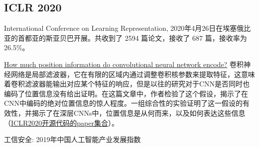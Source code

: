\begin{pre}
\subsection{ICLR 2020}
International Conference on Learning Representation, 2020年4月26日在埃塞俄比亚的首都亚的斯亚贝巴开展。共收到了 2594 篇论文，接收了 687 篇，接收率为 26.5\%。

\href{https://openreview.net/forum?id=rJeB36NKvB}{How much position information do convolutional neural network encode?}
卷积神经网络是局部滤波器，它在有限的区域内通过调整卷积核参数来提取特征，这意味着卷积滤波器能输出对应某个特征的响应，但是以往的研究对于CNN是否同时也编码了位置信息没有给出证明。在这篇文章中，作者检验了这个假设，揭示了在CNN中编码的绝对位置信息的惊人程度。一组综合性的实验证明了这一假设的有效性，并揭示了在深层CNNs中，位置信息是从何而来，以及如何表达这些信息（\href{https://www.paperdigest.org/2019/12/iclr-2020-papers-with-code/}{ICLR2020开源代码的paper集合}）。

工信安全: 2019年中国人工智能产业发展指数
\end{pre} 